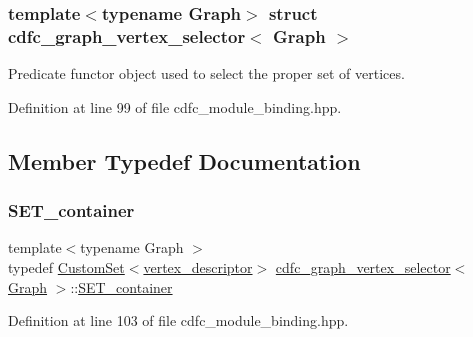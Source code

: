 \subsubsection*{template$<$typename Graph$>$\newline
struct cdfc\+\_\+graph\+\_\+vertex\+\_\+selector$<$ Graph $>$}

Predicate functor object used to select the proper set of vertices. 

Definition at line 99 of file cdfc\+\_\+module\+\_\+binding.\+hpp.



\subsection{Member Typedef Documentation}
\mbox{\label{structcdfc__graph__vertex__selector_a4eabaf16609aadaa7ed6bcb236d82950}} 
\subsubsection{\texorpdfstring{S\+E\+T\+\_\+container}{SET\_container}}
{\footnotesize\ttfamily template$<$typename Graph $>$ \\
typedef \hyperlink{custom__set_8hpp_a615bc2f42fc38a4bb1790d12c759e86f}{Custom\+Set}$<$\hyperlink{structcdfc__graph__vertex__selector_a4cafbcfc2a2a46718e5a8330b56398fb}{vertex\+\_\+descriptor}$>$ \hyperlink{structcdfc__graph__vertex__selector}{cdfc\+\_\+graph\+\_\+vertex\+\_\+selector}$<$ \hyperlink{structGraph}{Graph} $>$\+::\hyperlink{structcdfc__graph__vertex__selector_a4eabaf16609aadaa7ed6bcb236d82950}{S\+E\+T\+\_\+container}}



Definition at line 103 of file cdfc\+\_\+module\+\_\+binding.\+hpp.

\mbox{\label{structcdfc__graph__vertex__selector_a4cafbcfc2a2a46718e5a8330b56398fb}} 
